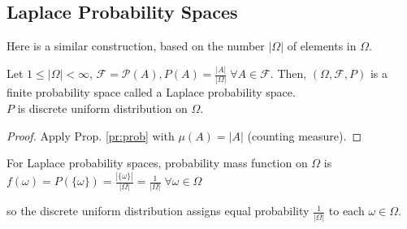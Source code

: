 \documentclass{article}
\begin{document}
	\newpage\subsection{Laplace Probability Spaces}
	Here is a similar construction, based on the number $|\Omega|$ of elements in $\Omega$.
	\begin{myprop}{}{}
		Let $1\leq|\Omega|<\infty$, $\mathcal{F}=\mathcal{P}(A), P(A)=\frac{|A|}{|\Omega|}\;\forall A\in\mathcal{F}$. Then, $(\Omega, \mathcal{F}, P)$ is a finite probability space called a Laplace probability space.\\
		
		$P$ is discrete uniform distribution on $\Omega$.
		
		\begin{proof}
			Apply Prop. \ref{pr:prob} with $\mu(A)=|A|$ (counting measure).
		\end{proof}
	\end{myprop}
	
	\begin{myrem}{}{}
		For Laplace probability spaces, probability mass function on $\Omega$ is\\
		
		$f(\omega)=P(\{\omega\})=\frac{|\{\omega\}|}{|\Omega|}=\frac{1}{|\Omega|}\;\forall\omega\in\Omega$
		
		so the discrete uniform distribution assigns equal probability $\frac{1}{|\Omega|}$ to each $\omega\in\Omega$.
	\end{myrem}
	
\end{document}
